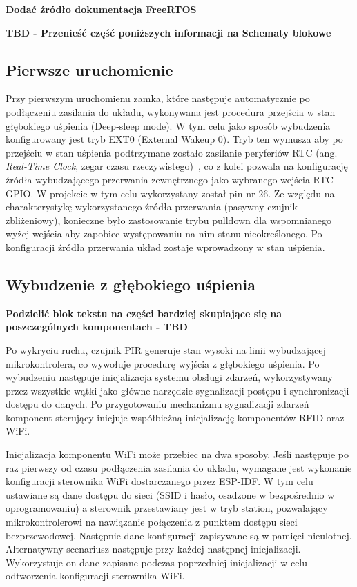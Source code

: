                 \textbf{Dodać źródło dokumentacja FreeRTOS}

            \textbf{TBD - Przenieść część poniższych informacji na Schematy blokowe}

            \subsection{Pierwsze uruchomienie}

                Przy pierwszym uruchomienu zamka, które następuje automatycznie po podłączeniu zasilania do układu, wykonywana jest procedura przejścia w stan głębokiego uśpienia (Deep-sleep mode). W tym celu jako sposób wybudzenia konfigurowany jest tryb EXT0 (External Wakeup 0). Tryb ten wymusza aby po przejściu w stan uśpienia podtrzymane zostało zasilanie peryferiów RTC (ang. \textit{Real-Time Clock}, zegar czasu rzeczywistego)~\cite{esp32-api-ref-deep-sleep}, co z kolei pozwala na konfigurację źródła wybudzającego przerwania zewnętrznego jako wybranego wejścia RTC GPIO. W projekcie w tym celu wykorzystany został pin nr 26. Ze względu na charakterystykę wykorzystanego źródła przerwania (pasywny czujnik zbliżeniowy), konieczne było zastosowanie trybu pulldown dla wspomnianego wyżej wejścia aby zapobiec występowaniu na nim stanu nieokreślonego. Po konfiguracji źródła przerwania układ zostaje wprowadzony w stan uśpienia.

            \subsection{Wybudzenie z głębokiego uśpienia}

                \textbf{Podzielić blok tekstu na części bardziej skupiające się na poszczególnych komponentach - TBD}

                Po wykryciu ruchu, czujnik PIR generuje stan wysoki na linii wybudzającej mikrokontrolera, co wywołuje procedurę wyjścia z głębokiego uśpienia. Po wybudzeniu następuje inicjalizacja systemu obsługi zdarzeń, wykorzystywany przez wszystkie wątki jako główne narzędzie sygnalizacji postępu i synchronizacji dostępu do danych. Po przygotowaniu mechanizmu sygnalizacji zdarzeń komponent sterujący inicjuje współbieżną inicjalizację komponentów RFID oraz WiFi.

                Inicjalizacja komponentu WiFi może przebiec na dwa sposoby. Jeśli następuje po raz pierwszy od czasu podłączenia zasilania do układu, wymagane jest wykonanie konfiguracji sterownika WiFi dostarczanego przez ESP-IDF. W tym celu ustawiane są dane dostępu do sieci (SSID i hasło, osadzone w bezpośrednio w oprogramowaniu) a sterownik przestawiany jest w tryb station, pozwalający mikrokontrolerowi na nawiązanie połączenia z punktem dostępu sieci bezprzewodowej. Następnie dane konfiguracji zapisywane są w pamięci nieulotnej. Alternatywny scenariusz następuje przy każdej następnej inicjalizacji. Wykorzystuje on dane zapisane podczas poprzedniej inicjalizacji w celu odtworzenia konfiguracji sterownika WiFi.


